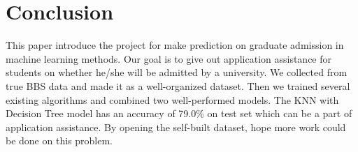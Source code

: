 \documentclass{article}
\begin{document}
\section{Conclusion}

This paper introduce the project for make prediction on graduate admission in machine learning methods. Our goal is to give out application assistance for students on whether he/she will be admitted by a university. We collected from true BBS data and made it as a well-organized dataset. Then we trained several existing algorithms and combined two well-performed models. The KNN with Decision Tree model has an accuracy of 79.0\% on test set which can be a part of application assistance. By opening the self-built dataset, hope more work could be done on this problem.



\end{document}
